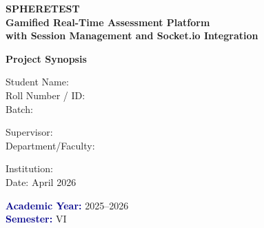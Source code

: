 \documentclass[12pt,a4paper]{report}
\begin{document}
\frontmatter


\begin{titlepage}
  \begin{center}
    \vspace*{1.5cm}
    {\color{titleblue}\Large\bfseries\sffamily
      SPHERETEST \\[0.5cm]
      Gamified Real-Time Assessment Platform \\[0.3cm]
      with Session Management and Socket.io Integration
    }
    \vspace{3cm}
    
    {\Large\bfseries\sffamily Project Synopsis}
    \vspace{3.5cm}
    
    {\normalsize\sffamily
      Student Name: \underline{\hspace{7cm}} \\[0.8cm]
      Roll Number / ID: \underline{\hspace{7cm}} \\[0.8cm]
      Batch: \underline{\hspace{7cm}} \\[0.8cm]
    }
    \vspace{2.5cm}
    
    {\normalsize\sffamily
      Supervisor: \underline{\hspace{7cm}} \\[0.8cm]
      Department/Faculty: \underline{\hspace{7cm}} \\[0.8cm]
    }
    \vspace{2.5cm}
    
    {\normalsize\sffamily
      Institution: \underline{\hspace{7cm}} \\[0.5cm]
      Date: April 2026
    }
    \vfill
    
    {\small\sffamily
      \textcolor{darkblue}{\textbf{Academic Year:}} 2025--2026 \\
      \textcolor{darkblue}{\textbf{Semester:}} VI
    }
  \end{center}
\end{titlepage}

\cleardoublepage

\end{document}
